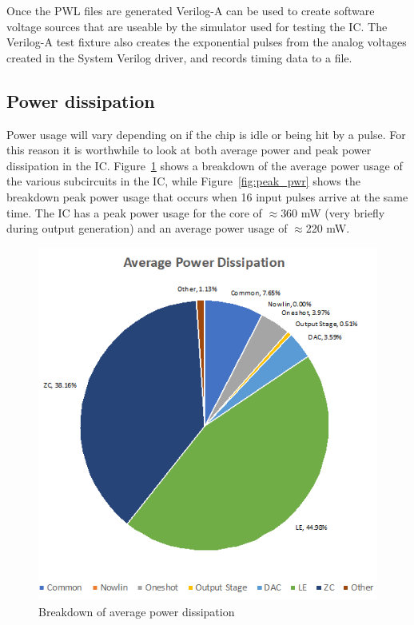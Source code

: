 \documentclass[12pt,oneside,final]{siuethesis}
\theoremstyle{definition}
\begin{document}


\par Once the PWL files are generated Verilog-A can be used to create software voltage sources that are useable by the simulator used for testing the IC. The Verilog-A test fixture also creates the exponential pulses from the analog voltages created in the System Verilog driver, and records timing data to a file. 

\subsection{Power dissipation}
\par Power usage will vary depending on if the chip is idle or being hit by a pulse. For this reason it is worthwhile to look at both average power and peak power dissipation in the IC. Figure~\ref{fig:avg_pwr} shows a breakdown of the average power usage of the various subcircuits in the IC, while Figure~\ref{fig:peak_pwr} shows the breakdown peak power usage that occurs when 16 input pulses arrive at the same time. The IC has a peak power usage for the core of $\approx$360 mW (very briefly during output generation) and an average power usage of $\approx$220 mW.
\begin{figure}[htbp!]
 \centering
 \includegraphics[scale=1]{./ch4_figures/average_power.png}
 \caption{Breakdown of average power dissipation}
 \label{fig:avg_pwr}
\end{figure} 
\end{document}
